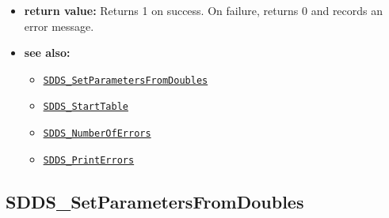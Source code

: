 \documentclass[11pt]{article}
\newcommand{\progref}[1]{\hyperref[SDDS_#1]{\tt SDDS\_#1}}
\begin{document}
\begin{itemize}
\begin{itemize}
\begin{itemize}
\end{itemize}
Note that for data of type SDDS\_STRING, pass-by-value means passing an item of type char *, while pass by reference means passing an item of type char **.
\end{itemize}
\item {\bf return value:}\newline
Returns 1 on success. On failure, returns 0 and records an error message.
\item {\bf see also:}
\begin{itemize}
\item \progref{SetParametersFromDoubles}
\item \progref{StartTable}
\item \progref{NumberOfErrors}
\item \progref{PrintErrors}
\end{itemize}
\end{itemize}

\subsection{SDDS\_SetParametersFromDoubles}
\label{SDDS_SetParametersFromDoubles}
\end{document}
